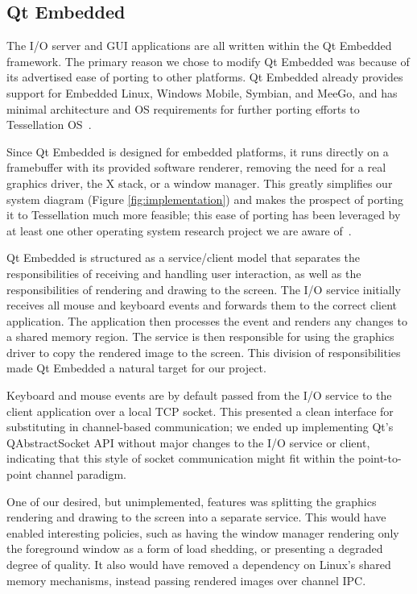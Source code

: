 \documentclass[letterpaper,twocolumn,11pt]{article}
\begin{document}
\subsection{Qt Embedded}

The I/O server and GUI applications are all written within the Qt Embedded framework. The primary reason we chose to modify Qt Embedded was because of its advertised ease of porting to other platforms. Qt Embedded already provides support for Embedded Linux, Windows Mobile, Symbian, and MeeGo, and has minimal architecture and OS requirements for further porting efforts to Tessellation OS~\cite{qtembedded}.

Since Qt Embedded is designed for embedded platforms, it runs directly on a framebuffer with its provided software renderer, removing the need for a real graphics driver, the X stack, or a window manager. This greatly simplifies our system diagram (Figure \ref{fig:implementation}) and makes the prospect of porting it to Tessellation much more feasible; this ease of porting has been leveraged by at least one other operating system research project we are aware of~\cite{ibos}. 

Qt Embedded is structured as a service/client model that separates the responsibilities of receiving and handling user interaction, as well as the responsibilities of rendering and drawing to the screen. The I/O service initially receives all mouse and keyboard events and forwards them to the correct client application. The application then processes the event and renders any changes to a shared memory region. The service is then responsible for using the graphics driver to copy the rendered image to the screen. This division of responsibilities made Qt Embedded a natural target for our project.

Keyboard and mouse events are by default passed from the I/O service to the client application over a local TCP socket. This presented a clean interface for substituting in channel-based communication; we ended up implementing Qt's QAbstractSocket API without major changes to the I/O service or client, indicating that this style of socket communication might fit within the point-to-point channel paradigm.

One of our desired, but unimplemented, features was splitting the graphics rendering and drawing to the screen into a separate service. This would have enabled interesting policies, such as having the window manager rendering only the foreground window as a form of load shedding, or presenting a degraded degree of quality. It also would have removed a dependency on Linux's shared memory mechanisms, instead passing rendered images over channel IPC.
\end{document}
